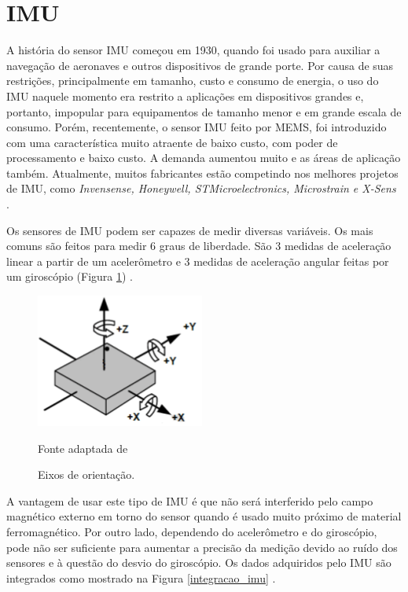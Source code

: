 	\section{IMU}

		A história do sensor IMU começou em 1930, quando foi usado para auxiliar a navegação de aeronaves e outros dispositivos de grande porte. Por causa de suas restrições, principalmente em tamanho, custo e consumo de energia, o uso do IMU naquele momento era restrito a aplicações em dispositivos grandes e, portanto, impopular para equipamentos de tamanho menor e em grande escala de consumo. Porém, recentemente, o sensor IMU feito por MEMS, foi introduzido com uma característica muito atraente de baixo custo, com poder de processamento e baixo custo. A demanda aumentou muito e as áreas de aplicação também. Atualmente, muitos fabricantes estão competindo nos melhores projetos de IMU, como \textit{Invensense, Honeywell, STMicroelectronics, Microstrain e X-Sens} \cite{ahmad2013}.
		
		Os sensores de IMU podem ser capazes de medir diversas variáveis. Os mais comuns são feitos para medir 6 graus de liberdade. São 3 medidas de aceleração linear a partir de um acelerômetro e 3 medidas de aceleração angular feitas por um giroscópio (Figura \ref{eixos_imu}) \cite{santos2016}.
		 
		\begin{figure}[h]
			\centering
			\includegraphics[keepaspectratio=true,scale=0.8]{figuras/Eixos_imu.png}
			\caption{Eixos de orientação.}
			Fonte adaptada de \cite{mpu6050}
			\label{eixos_imu}	
		\end{figure}


		A vantagem de usar este tipo de IMU é que não será interferido pelo campo magnético externo em torno do
		sensor quando é usado muito próximo de material ferromagnético. Por outro lado, dependendo do acelerômetro e do giroscópio, pode não ser suficiente para aumentar a precisão da medição devido ao ruído dos sensores e à questão do desvio do giroscópio. Os dados adquiridos pelo IMU são integrados como mostrado na Figura \ref{integracao_imu} \cite{ahmad2013}.

